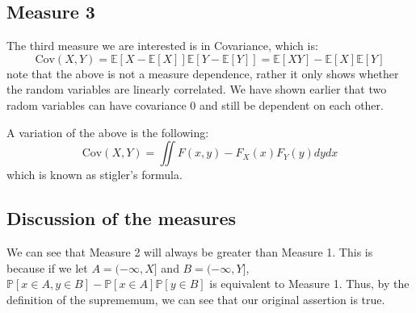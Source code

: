 \documentclass[12pt]{article}
\newcommand{\fP}{\mathbb{P}}
\newcommand{\E}{\mathbb{E}}
\newcommand{\Cov}{\text{Cov}}
\begin{document}
\subsection{Measure 3}
The third measure we are interested is in Covariance, which is:
\[
	\Cov(X, Y) = \E[X - \E[X]]\E[Y - \E[Y]] = \E[XY] - \E[X]\E[Y]
\]
note that the above is not a measure dependence, rather it only shows whether the random variables are linearly correlated. We have shown earlier that two radom variables can have covariance 0 and still be dependent on each other. 

A variation of the above is the following:
\[
	\Cov(X, Y) = \iint F(x,y) - F_X(x)  F_Y(y) dy dx 
\]
which is known as stigler's formula. 
\subsection{Discussion of the measures}
We can see that Measure 2 will always be greater than Measure 1. This is because if we let $A = (-\infty, X]$ and $B = (-\infty, Y]$, $ \fP[x \in A, y \in B] - \fP[x \in A]\fP[y \in B]$ is equivalent to Measure 1. Thus, by the definition of the suprememum, we can see that our original assertion is true.  
\end{document}
